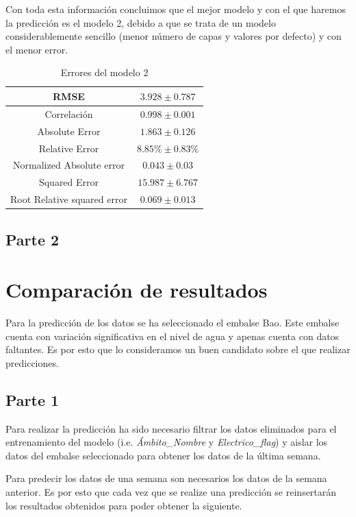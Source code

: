 \documentclass[12pt]{report} %
\begin{document}
    Con toda esta información concluimos que el mejor modelo y con el que haremos la predicción es el modelo 2, debido a que se trata de un modelo considerablemente sencillo (menor número de capas y valores por defecto) y con el menor error.

\begin{table}[H]
\begin{center}
\begin{tabular}{|c|c|}
    \hline
    RMSE & $3.928\pm0.787$\\ 
    \hline
    Correlación & $0.998\pm 0.001$\\
    \hline
    Absolute Error & $1.863\pm0.126$\\
    \hline
    Relative Error & $8.85\%\pm 0.83\%$\\
    \hline
    Normalized Absolute error & $0.043\pm0.03$\\
    \hline
    Squared Error & $15.987\pm 6.767$\\ 
    \hline
    Root Relative squared error & $0.069 \pm 0.013$\\
    \hline
\end{tabular}
\caption{Errores del modelo 2}
\end{center}
\end{table}
	\section{Parte 2}

\chapter{Comparación de resultados}
\label{chap:result-comparing}

Para la predicción de los datos se ha seleccionado el embalse Bao. Este embalse cuenta con variación significativa en el nivel de agua y apenas cuenta con datos faltantes. Es por esto que lo consideramos un buen candidato sobre el que realizar predicciones.

\section{Parte 1}
Para realizar la predicción ha sido necesario filtrar los datos eliminados para el entrenamiento del modelo (i.e. \textit{Ámbito\_Nombre} y \textit{Electrico\_flag}) y aislar los datos del embalse seleccionado para obtener los datos de la última semana.

Para predecir los datos de una semana son necesarios los datos de la semana anterior. Es por esto que cada vez que se realize una predicción se reinsertarán los resultados obtenidos para poder obtener la siguiente.
\end{document}
